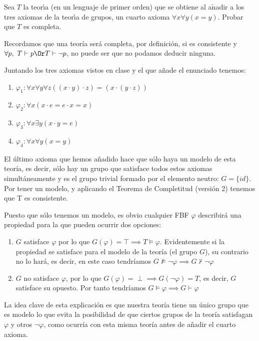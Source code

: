 \begin{problem} 
Sea $T$ la teor\'{\i}a (en un lenguaje de primer orden) 
que se obtiene al a$\operatorname{\tilde{n}}$adir a los tres axiomas de la teor\'{\i}a de  grupos,
un cuarto axioma $\forall x\forall y (x = y)$. Probar que $T$ es completa.
\solution


Recordamos que una teoría será completa, por definición, si es consistente y $\forall p, \ T \vdash p \Or T\vdash \neg p$, no puede ser que no podamos deducir ninguna.

Juntando los tres axiomas vistos en clase y el que añade el enunciado tenemos:
\begin{enumerate}
\item $\varphi_1: \forall x\forall y\forall z ((x\cdot y)\cdot z) = (x\cdot(y\cdot z))$
\item $\varphi_2: \forall x(x\cdot e = e\cdot x = x)$
\item $\varphi_3: \forall x\exists y (x\cdot y = e)$
\item $\varphi_4: \forall x\forall y (x=y)$
\end{enumerate}

El último axioma que hemos añadido hace que sólo haya un modelo de esta teoría, es decir, sólo hay un grupo que satisface todos estos axiomas simultáneamente y es el grupo trivial formado por el elemento neutro: $G=\{id\}$. Por tener un modelo, y aplicando el Teorema de Completitud (versión 2) tenemos que T es consistente.

Puesto que sólo tenemos un modelo, es obvio cualquier FBF $\varphi$ describirá una propiedad para la que pueden ocurrir dos opciones:
\begin{enumerate}
\item $G$ satisface $\varphi$ por lo que $G(\varphi)=\top \implies  T \vDash \varphi $. Evidentemente si la propiedad se satisface para el modelo de la teoría (el grupo $G$), su contrario no lo hará, es decir, en este caso tendríamos $G \nvDash \neg \varphi \implies G \nvdash \neg \varphi$


\item $G$ no satisface $\varphi$, por lo que $G(\varphi) = \perp \implies G(\neg \varphi) = T$, es decir, $G$ satisface su opuesto. Por tanto tendríamos $G \vDash \varphi \implies G \vdash \varphi$
\end{enumerate}

La idea clave de esta explicación es que nuestra teoría tiene un único grupo que es modelo lo que evita la posibilidad de que ciertos grupos de la teoría satisfagan $\varphi$ y otros $\neg \varphi$, como ocurría con esta misma teoría antes de añadir el cuarto axioma.


\end{problem}

